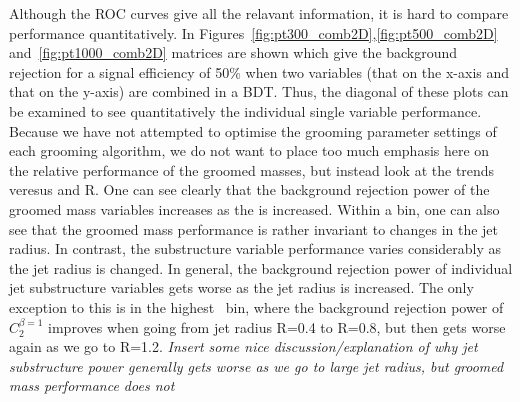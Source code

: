 Although the ROC curves give all the relavant information, it is hard
to compare performance quantitatively. In
Figures~\ref{fig:pt300_comb2D},\ref{fig:pt500_comb2D}
and~\ref{fig:pt1000_comb2D} matrices are shown which give the
background rejection for a signal efficiency of 50\% when two
variables (that on the x-axis and that on the y-axis) are combined in
a BDT. Thus, the diagonal of these plots can be examined to see
quantitatively the individual single variable performance. Because we
have not attempted to optimise the grooming parameter settings of
each grooming algorithm, we do not want to place too much emphasis
here on the relative performance of the groomed masses, but instead
look at the trends veresus \pt and R. One
can see clearly that the background rejection power of the groomed mass
variables increases as the \pt is increased. Within a \pt
bin, one can also see that the groomed mass performance is rather invariant to
changes in the jet radius. In contrast, the substructure variable
performance varies considerably as the jet radius is changed. In
general, the background rejection power of individual jet substructure
variables gets worse as the jet radius is increased. The only
exception to this is in the highest \pt~bin, where the background
rejection power of $C_2^{\beta=1}$ improves when going from jet radius
R=0.4 to R=0.8, but then gets worse again as we go to R=1.2. {\it
  Insert some nice discussion/explanation of why jet substructure
  power generally gets worse as we go to large jet radius, but groomed
mass performance does not}

